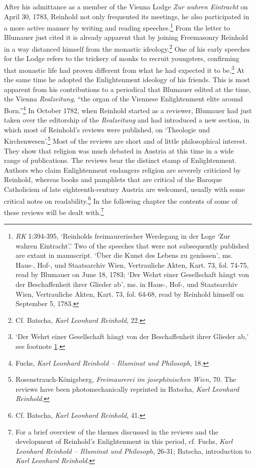  After his admittance as a member of the Vienna Lodge \textit{Zur wahren Eintracht} on April 30, 1783, Reinhold not only frequented its meetings, he also participated in a more active manner by writing and reading speeches.\footnote{\label{footnote:_Ref223691918} \textit{RK} 1:394{-}395, `Reinholds freimaurerischer Werdegang in der Loge `Zur wahren Eintracht'.' Two of the speeches that were not subsequently published are extant in manuscript. `\"{U}ber die Kunst des Lebens zu gen\"{u}ssen', ms. Haus{-}, Hof{-}, und Staatsarchiv Wien, Vertrauliche Akten, Kart. 73, fol. 74{-}75, read by Blumauer on June 18, 1783; `Der Wehrt einer Gesellschaft h\"{a}ngt von der Beschaffenheit ihrer Glieder ab', ms. in Haus{-}, Hof{-}, und Staatsarchiv Wien, Vertrauliche Akten, Kart. 73, fol. 64{-}68, read by Reinhold himself on September 5, 1783.} From the letter to Blumauer just cited it is already apparent that by joining Freemasonry Reinhold in a way distanced himself from the monastic ideology.\footnote{ Cf. Batscha, \textit{Karl Leonhard Reinhold}, 22. } One of his early speeches for the Lodge refers to the trickery of monks to recruit youngsters, confirming that monastic life had proven different from what he had expected it to be.\footnote{ `Der Wehrt einer Gesellschaft h\"{a}ngt von der Beschaffenheit ihrer Glieder ab,' see footnote \ref{footnote:_Ref223691918}. } At the same time he adopted the Enlightenment ideology of his friends. This is most apparent from his contributions to a periodical that Blumauer edited at the time, the Vienna \textit{Realzeitung}, ``the organ of the Viennese Enlightenment elite around Born.''\footnote{ Fuchs, \textit{Karl Leonhard Reinhold {--} Illuminat und Philosoph}, 18.} In October 1782, when Reinhold started as a reviewer, Blumauer had just taken over the editorship of the \textit{Realzeitung} and had introduced a new section, in which most of Reinhold's reviews were published, on `Theologie und Kirchenwesen'.\footnote{ Rosenstrauch{-}K\"{o}nigsberg, \textit{Freimaurerei im josephinischen Wien}, 70. The reviews have been photomechanically reprinted in Batscha, \textit{Karl Leonhard Reinhold}.} Most of the reviews are short and of little philosophical interest. They show that religion was much debated in Austria at this time in a wide range of publications. The reviews bear the distinct stamp of Enlightenment. Authors who claim Enlightenment endangers religion are severely criticized by Reinhold, whereas books and pamphlets that are critical of the Baroque Catholicism of late eighteenth{-}century Austria are welcomed, usually with some critical notes on readability.\footnote{ Cf. Batscha, \textit{Karl Leonhard Reinhold}, 41.} In the following chapter the contents of some of these reviews will be dealt with.\footnote{ For a brief overview of the themes discussed in the reviews and the development of Reinhold's Enlightenment in this period, cf. Fuchs, \textit{Karl Leonhard Reinhold {--} Illuminat und Philosoph}, 26{-}31; Batscha, introduction to \textit{Karl Leonhard Reinhold}. } 

